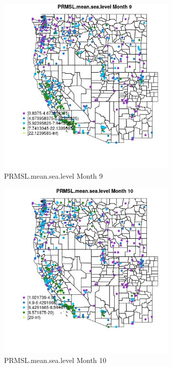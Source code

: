 \begin{figure} 
\centering  
\includegraphics[width=0.77\textwidth]{Code_Outputs/ML_input_report_ML_input_PM25_Step5_part_d_de_duplicated_aves_ML_input_MapObsMo9PRMSLmeansealevel.jpg} 
\caption{\label{fig:ML_input_report_ML_input_PM25_Step5_part_d_de_duplicated_aves_ML_inputMapObsMo9PRMSLmeansealevel}PRMSL.mean.sea.level Month 9} 
\end{figure} 
 

\begin{figure} 
\centering  
\includegraphics[width=0.77\textwidth]{Code_Outputs/ML_input_report_ML_input_PM25_Step5_part_d_de_duplicated_aves_ML_input_MapObsMo10PRMSLmeansealevel.jpg} 
\caption{\label{fig:ML_input_report_ML_input_PM25_Step5_part_d_de_duplicated_aves_ML_inputMapObsMo10PRMSLmeansealevel}PRMSL.mean.sea.level Month 10} 
\end{figure} 
 


